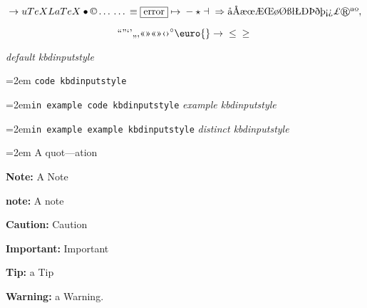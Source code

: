 \documentclass{book}
\begin{document}
\begin{titlepage}
$$
\rightarrow{}
u
TeX LaTeX \bullet{} \copyright{} \dots{} \dots{} \equiv{}
\fbox{error} \mapsto{} - \star{} \dashv{} \Rightarrow{}
\mathord{\text{\aa{}}} \mathord{\text{\AA{}}} \mathord{\text{\ae{}}} \mathord{\text{\oe{}}} \mathord{\text{\AE{}}} \mathord{\text{\OE{}}} \mathord{\text{\o{}}} \mathord{\text{\O{}}} \mathord{\text{\ss{}}} \mathord{\text{\l{}}} \mathord{\text{\L{}}} \mathord{\text{\DH{}}}
\mathord{\text{\TH{}}} \mathord{\text{\dh{}}} \mathord{\text{\th{}}} \mathord{\text{\textexclamdown{}}} \mathord{\text{\textquestiondown{}}} \mathsterling{}
\circledR{} \mathord{\text{\textordfeminine{}}} \mathord{\text{\textordmasculine{}}} , 
$$

$$
\mathord{\text{\textquotedblleft{}}} \mathord{\text{\textquotedblright{}}} 
\mathord{\text{\textquoteleft{}}} \mathord{\text{\textquoteright{}}} \mathord{\text{\quotedblbase{}}} \mathord{\text{\quotesinglbase{}}} \mathord{\text{\guillemotleft{}}}
\mathord{\text{\guillemotright{}}} \mathord{\text{\guillemotleft{}}} \mathord{\text{\guillemotright{}}} \mathord{\text{\guilsinglleft{}}}
\mathord{\text{\guilsinglright{}}} ^{\circ{}} \euro{} \rightarrow{} \leq{} \geq{}
$$

{\ttfamily\textsl{default kbdinputstyle}}
\par\begingroup\obeylines\obeyspaces\frenchspacing\leftskip=2em\relax\parskip=0pt\relax{}
\endgroup{}
\texttt{code kbdinputstyle}
\par\begingroup\obeylines\obeyspaces\frenchspacing\leftskip=2em\relax\parskip=0pt\relax\ttfamily{}\texttt{in example code kbdinputstyle}
\endgroup{}
{\ttfamily\textsl{example kbdinputstyle}}
\par\begingroup\obeylines\obeyspaces\frenchspacing\leftskip=2em\relax\parskip=0pt\relax\ttfamily{}\texttt{in example example kbdinputstyle}
\endgroup{}
{\ttfamily\textsl{distinct kbdinputstyle}}
\par\begingroup\obeylines\obeyspaces\frenchspacing\leftskip=2em\relax\parskip=0pt\relax{}
\endgroup{}
A quot---ation

\textbf{Note:} A Note

\textbf{note:} A note

\textbf{Caution:} Caution

\textbf{Important:} Important

\textbf{Tip:} a Tip

\textbf{Warning:} a Warning.


\end{titlepage}
\end{document}
